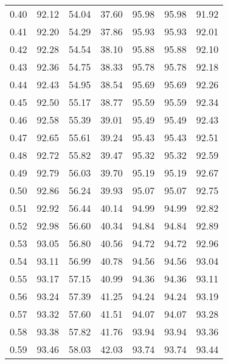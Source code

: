 \begin{tabular}{|c|c|c|c|c|c|c|}
      0.40 &     92.12 &     54.04 &      37.60 &   95.98 &      95.98 &         91.92 \\
      0.41 &     92.20 &     54.29 &      37.86 &   95.93 &      95.93 &         92.01 \\
      0.42 &     92.28 &     54.54 &      38.10 &   95.88 &      95.88 &         92.10 \\
      0.43 &     92.36 &     54.75 &      38.33 &   95.78 &      95.78 &         92.18 \\
      0.44 &     92.43 &     54.95 &      38.54 &   95.69 &      95.69 &         92.26 \\
      0.45 &     92.50 &     55.17 &      38.77 &   95.59 &      95.59 &         92.34 \\
      0.46 &     92.58 &     55.39 &      39.01 &   95.49 &      95.49 &         92.43 \\
      0.47 &     92.65 &     55.61 &      39.24 &   95.43 &      95.43 &         92.51 \\
      0.48 &     92.72 &     55.82 &      39.47 &   95.32 &      95.32 &         92.59 \\
      0.49 &     92.79 &     56.03 &      39.70 &   95.19 &      95.19 &         92.67 \\
      0.50 &     92.86 &     56.24 &      39.93 &   95.07 &      95.07 &         92.75 \\
      0.51 &     92.92 &     56.44 &      40.14 &   94.99 &      94.99 &         92.82 \\
      0.52 &     92.98 &     56.60 &      40.34 &   94.84 &      94.84 &         92.89 \\
      0.53 &     93.05 &     56.80 &      40.56 &   94.72 &      94.72 &         92.96 \\
      0.54 &     93.11 &     56.99 &      40.78 &   94.56 &      94.56 &         93.04 \\
      0.55 &     93.17 &     57.15 &      40.99 &   94.36 &      94.36 &         93.11 \\
      0.56 &     93.24 &     57.39 &      41.25 &   94.24 &      94.24 &         93.19 \\
      0.57 &     93.32 &     57.60 &      41.51 &   94.07 &      94.07 &         93.28 \\
      0.58 &     93.38 &     57.82 &      41.76 &   93.94 &      93.94 &         93.36 \\
      0.59 &     93.46 &     58.03 &      42.03 &   93.74 &      93.74 &         93.44 \\

\end{tabular}
